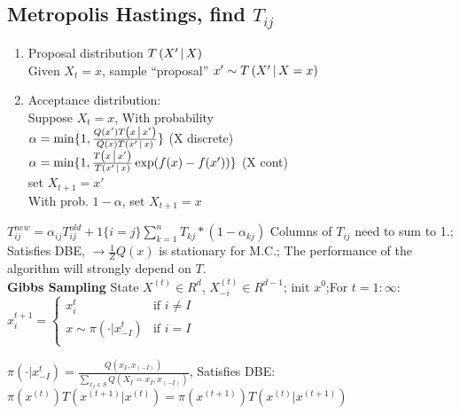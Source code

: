 \subsection{Metropolis Hastings, find $T_{ij}$}
\begin{enumerate}
  \item Proposal distribution $T\left( X' \,\middle|\, X \right)$\\
  Given $X_t=x$, sample ``proposal'' $x'\sim T\left( X' \,\middle|\, X=x \right)$
  \item Acceptance distribution:\\
    Suppose $X_t=x$, With probability\\
	$\alpha =
    \min\{1,\frac{Q(x')T\left( x \,\middle|\, x' \right)}{Q(x)T\left( x' \,\middle|\, x \right)}\}$ (X discrete)\\
	$\alpha =
    \min\{1,\frac{T\left( x \,\middle|\, x' \right)}{T\left( x' \,\middle|\, x \right)}\exp(f(x)-f(x'))\}$ (X cont)\\
    set $X_{t+1}=x'$\\
    With prob. $1-\alpha$, set $X_{t+1}=x$
\end{enumerate}
$T_{ij}^{new} = \alpha_{ij}T_{ij}^{old} + 1 \{i=j\} \sum_{k=1}^{n}T_{kj}*(1-\alpha_{kj})$
Columns of $T_{ij}$ need to sum to 1.;
Satisfies DBE, $\rightarrow \frac{1}{Z} Q(x)$ is stationary for M.C.;
The performance of the algorithm will strongly depend on $T$.\\
\textbf{Gibbs Sampling}
State $X^{(t)} \in R^{d}$, $X_{-i}^{(t)} \in R^{d-1}$; init $x^{0}$;For $t= 1: \infty$:\\
$x_{i}^{t+1} =
\begin{cases}
  x_{i}^{t} & \text{if $i \neq I$}\\
  x \sim \pi(\cdot| x_{-I}^{t}) & \text{if $i = I$}\\
\end{cases}$

$\pi(\cdot| x_{-I}^{t}) = \frac{Q(x_{I}, x_{(-I)})}{\sum_{x_{I} \in S}Q(X_{I}=x_{I}, x_{(-I)})}$,
Satisfies DBE: $\pi(x^{(t)})T(x^{(t+1)}|x^{(t)}) = \pi(x^{(t+1)})T(x^{(t)}|x^{(t+1)})$

